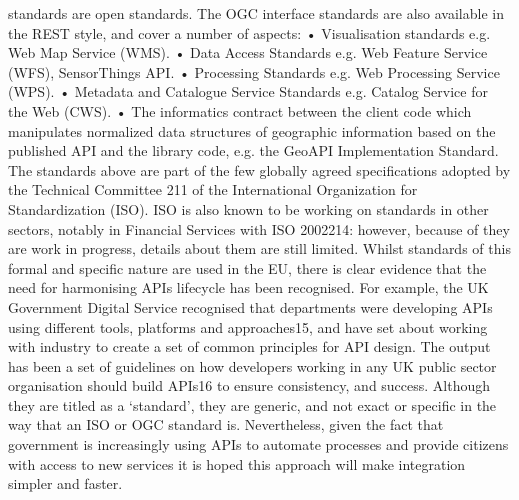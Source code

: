 standards are open standards. The OGC interface standards are also available in the REST style, and
cover a number of aspects:
• Visualisation standards e.g. Web Map Service (WMS).
• Data Access Standards e.g. Web Feature Service (WFS), SensorThings API.
• Processing Standards e.g. Web Processing Service (WPS).
• Metadata and Catalogue Service Standards e.g. Catalog Service for the Web (CWS).
• The informatics contract between the client code which manipulates normalized data structures of
geographic information based on the published API and the library code, e.g. the GeoAPI
Implementation Standard.
The standards above are part of the few globally agreed specifications adopted by the Technical Committee
211 of the International Organization for Standardization (ISO). ISO is also known to be working on
standards in other sectors, notably in Financial Services with ISO 2002214: however, because of they are
work in progress, details about them are still limited.
Whilst standards of this formal and specific nature are used in the EU, there is clear evidence that the need
for harmonising APIs lifecycle has been recognised. For example, the UK Government Digital Service
recognised that departments were developing APIs using different tools, platforms and approaches15, and
have set about working with industry to create a set of common principles for API design. The output has
been a set of guidelines on how developers working in any UK public sector organisation should build
APIs16 to ensure consistency, and success. Although they are titled as a ‘standard’, they are generic, and
not exact or specific in the way that an ISO or OGC standard is. Nevertheless, given the fact that
government is increasingly using APIs to automate processes and provide citizens with access to new
services it is hoped this approach will make integration simpler and faster.